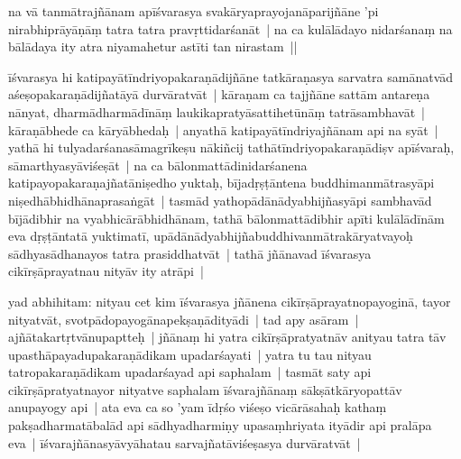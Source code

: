 \documentclass[article,12pt,a4paper]{memoir}
\begin{document}
	  \pstart na vā tanmātrajñānam apīśvarasya  svakāryaprayojanāparijñāne 'pi nirabhiprāyāṇāṃ tatra tatra pravṛttidarśanāt | na ca kulālādayo nidarśanaṃ na bālādaya ity atra niyamahetur astī\label{nk-150.14}ti tan nirastam ||
	\pend
      

	  \pstart īśvarasya hi katipayātīndriyopakaraṇādijñāne tatkāraṇasya sarvatra samānatvād aśeṣopakaraṇādijñatāyā durvāratvāt | kāraṇam ca tajjñāne sattām antareṇa nānyat, dharmādharmādīnāṃ laukikapratyāsattihetūnāṃ tatrāsambhavāt | kāraṇābhede ca kāryābhedaḥ | anyathā katipayātīndriyajñānam api na syāt | yathā hi  tulyadarśanasāmagrīkeṣu nākiñcij tathātīndriyopakaraṇādiṣv apīśvaraḥ, sāmarthyasyāviśeṣāt | na ca bālonmattādinidarśanena katipayopakaraṇajñatāniṣedho yuktaḥ, bījadṛṣṭāntena buddhimanmātrasyāpi niṣedhābhidhānaprasaṅgāt | tasmād yathopādānādyabhijñasyāpi sambhavād bījādibhir na vyabhicārābhidhānam, tathā bālonmattādibhir apīti kulālādīnām eva dṛṣṭāntatā yuktimatī, upādānādyabhijñabuddhivanmātrakāryatvayoḥ sādhyasādhanayos tatra prasiddhatvāt | tathā jñānavad īśvarasya cikīrṣāprayatnau nityāv ity atrāpi |
	\pend
      

	  \pstart yad abhihitam: nityau cet kim īśvarasya jñānena cikīrṣāprayatnopayoginā, tayor nityatvāt, svotpādopayogānapekṣaṇādityādi | tad apy asāram | ajñātakartṛtvānupaptteḥ | jñānaṃ hi yatra cikīrṣāpratyatnāv anityau tatra tāv upasthāpayadupakaraṇādikam upadarśayati | yatra tu tau nityau tatropakaraṇādikam upadarśayad api saphalam | tasmāt saty api cikīrṣāpratyatnayor nityatve saphalam īśvarajñānaṃ sākṣātkāryopattāv anupayogy api | ata eva ca so 'yam īdṛśo viśeṣo vicārāsahaḥ kathaṃ pakṣadharmatābalād api sādhyadharmiṇy upasaṃhriyata ityādir api pralāpa eva | īśvarajñānasyāvyāhatau sarvajñatāviśeṣasya durvāratvāt |
	\pend
      
\end{document}
